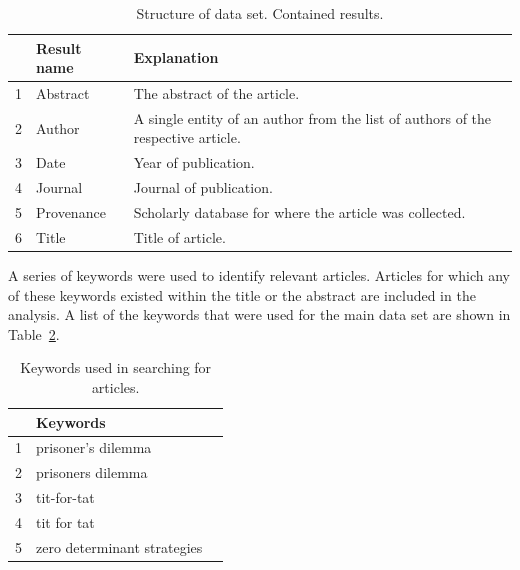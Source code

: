 \documentclass{article}
\theoremstyle{definition}
\begin{document}
\begin{table}[!hbtp]
    \begin{center}
        \begin{tabular}{lll}
            \toprule
             & Result name & Explanation \\
             \midrule
             1 & Abstract & The abstract of the article.\\ 
             2 & Author & A single entity of an author from the list of
             authors of the respective article.\\ 
             3 & Date & Year of publication.\\ 
             4 & Journal & Journal of publication.\\ 
             5 & Provenance & Scholarly database for where the article was
             collected.\\ 
             6 & Title & Title of article.\\ 
            \bottomrule
        \end{tabular}
    \end{center}
    \caption{Structure of data set. Contained results.}
    \label{table:result_set}
\end{table}

A series of keywords were used to identify relevant articles. Articles for which
any of these keywords existed within the title or the abstract are included in the
analysis. A list of the keywords that were used for the main data set are shown
in Table~\ref{table:search_keywords}.

\begin{table}[!hbtp]
    \begin{center}
        \begin{tabular}{lll}
            \toprule
             & Keywords & \\
            \midrule
             1 &  prisoner's dilemma & \\
             2 &  prisoners dilemma  & \\
             3 &  tit-for-tat & \\
             4 &  tit for tat & \\
             5 &  zero determinant strategies & \\
            \bottomrule
        \end{tabular}
    \end{center}
    \caption{Keywords used in searching for articles.}
    \label{table:search_keywords}
\end{table}
\end{document}
